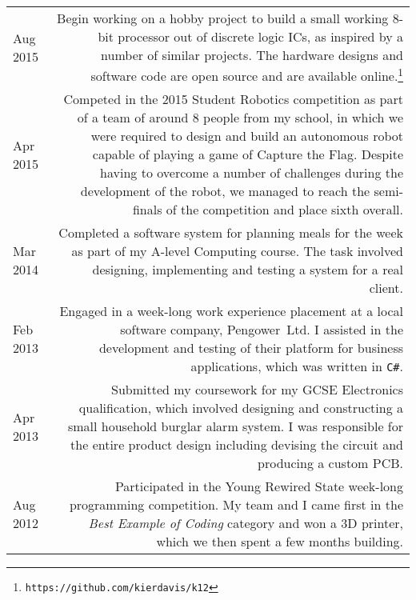 
\begin{longtable}{L!{\sep}R}
    Aug 2015 & Begin working on a hobby project to build a small working 8-bit processor out of discrete logic ICs, as inspired by a number of similar projects. The hardware designs and software code are open source and are available online.\footnote{\texttt{https://github.com/kierdavis/k12}} \vspace{1.2em} \\

    Apr 2015 & Competed in the 2015 Student Robotics competition as part of a team of around 8 people from my school, in which we were required to design and build an autonomous robot capable of playing a game of Capture the Flag. Despite having to overcome a number of challenges during the development of the robot, we managed to reach the semi-finals of the competition and place sixth overall. \vspace{1.2em} \\

    Mar 2014 & Completed a software system for planning meals for the week as part of my A-level Computing course. The task involved designing, implementing and testing a system for a real client. \vspace{1.2em} \\


    Feb 2013 & Engaged in a week-long work experience placement at a local software company, \mbox{Pengower Ltd}. I assisted in the development and testing of their platform for business applications, which was written in \texttt{C\#}. \vspace{1.2em} \\

    Apr 2013 & Submitted my coursework for my GCSE Electronics qualification, which involved designing and constructing a small household burglar alarm system. I was responsible for the entire product design including devising the circuit and producing a custom PCB. \vspace{1.2em} \\

    Aug 2012 & Participated in the Young Rewired State week-long programming competition. My team and I came first in the \emph{Best Example of Coding} category and won a 3D printer, which we then spent a few months building. \vspace{1.2em} \\


\end{longtable}
